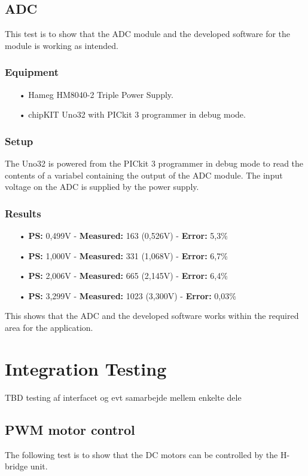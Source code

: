 \subsection{ADC}
This test is to show that the ADC module and the developed software for the module is working as intended.

\subsubsection{Equipment}
\begin{enumerate}
	\item[•]Hameg HM8040-2 Triple Power Supply.
	\item[•]chipKIT Uno32 with PICkit 3 programmer in debug mode.
\end{enumerate}

\subsubsection{Setup}
The Uno32 is powered from the PICkit 3 programmer in debug mode to read the contents of a variabel containing the output of the ADC module.
The input voltage on the ADC is supplied by the power supply.

\subsubsection{Results}
\begin{enumerate}
	\item[•] \textbf{PS:} 0,499V - \textbf{Measured:} 163 (0,526V) - \textbf{Error:} 5,3\%
	\item[•] \textbf{PS:} 1,000V - \textbf{Measured:} 331 (1,068V) - \textbf{Error:} 6,7\%
	\item[•] \textbf{PS:} 2,006V - \textbf{Measured:} 665 (2,145V) - \textbf{Error:} 6,4\%
	\item[•] \textbf{PS:} 3,299V - \textbf{Measured:} 1023 (3,300V) - \textbf{Error:} 0,03\%
\end{enumerate}
This shows that the ADC and the developed software works within the required area for the application.
\newpage
\section{Integration Testing}
TBD testing af interfacet og evt samarbejde mellem enkelte dele

\subsection{PWM motor control}
The following test is to show that the DC motors can be controlled by the H-bridge unit.

